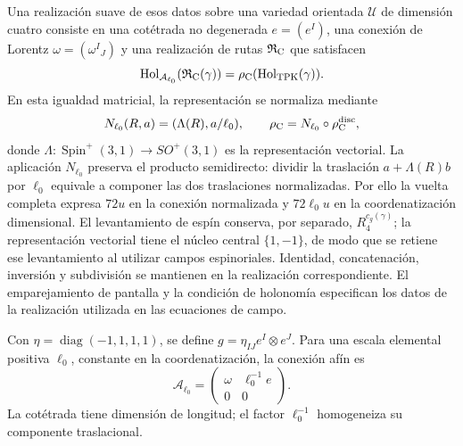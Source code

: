 Una realización suave de esos datos sobre una variedad orientada
\(\mathcal U\) de dimensión cuatro consiste en una cotétrada
no degenerada \(e=(e^I)\), una conexión de Lorentz
\(\omega=(\omega^I{}_J)\) y una realización de rutas
\(\mathfrak R_{\rm C}\) que satisfacen
\begin{equation}
 \operatorname{Hol}_{\mathcal A_{\ell_0}}
       (\mathfrak R_{\rm C}(\gamma))
 =\rho_{\rm C}(\operatorname{Hol}_{\rm TPK}(\gamma)).
 \label{vii:eq:compatibilidad-holonomia-geometrica}
\end{equation}
En esta igualdad matricial, la representación se normaliza mediante
\[
 N_{\ell_0}(R,a)=(\Lambda(R),a/\ell_0),\qquad
 \rho_{\rm C}=N_{\ell_0}\circ\rho_{\rm C}^{\rm disc},
\]
donde \(\Lambda:\operatorname{Spin}^+(3,1)\to SO^+(3,1)\)
es la representación vectorial. La aplicación \(N_{\ell_0}\)
preserva el producto semidirecto: dividir la traslación
\(a+\Lambda(R)b\) por \(\ell_0\) equivale a componer las
dos traslaciones normalizadas. Por ello la vuelta completa expresa
\(72u\) en la conexión normalizada y \(72\ell_0u\) en la
coordenatización dimensional. El levantamiento de espín conserva, por separado,
\(R_4^{c_g(\gamma)}\); la representación vectorial tiene el
núcleo central \(\{1,-1\}\), de modo que se retiene ese
levantamiento al utilizar campos espinoriales.
Identidad, concatenación, inversión y subdivisión se mantienen en la
realización correspondiente. El emparejamiento de
pantalla y la condición de holonomía especifican los datos de la
realización utilizada en las ecuaciones de campo.

Con \(\eta=\operatorname{diag}(-1,1,1,1)\), se define
\(g=\eta_{IJ}e^I\otimes e^J\). Para una escala elemental
positiva \(\ell_0\), constante en la coordenatización, la conexión afín es
\begin{equation}
 \mathcal A_{\ell_0}
 =\begin{pmatrix}\omega&\ell_0^{-1}e\\0&0\end{pmatrix}.
 \label{vii:eq:conexion-afin-realizada}
\end{equation}
La cotétrada tiene dimensión de longitud; el factor
\(\ell_0^{-1}\) homogeneiza su componente traslacional.

